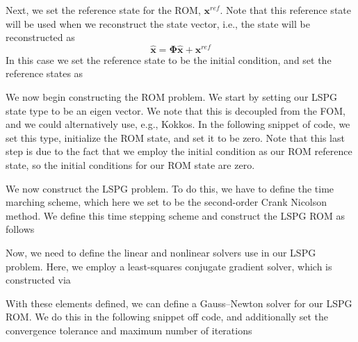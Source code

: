 Next, we set the reference state for the R\+OM, $\boldsymbol x^{ref}$. Note that this reference state will be used when we reconstruct the state vector, i.\+e., the state will be reconstructed as \[\hat{ \boldsymbol x} = \boldsymbol \Phi \hat{\boldsymbol x} + \boldsymbol x^{ref}\] In this case we set the reference state to be the initial condition, and set the reference states as 
\begin{DoxyCode}{0}
\end{DoxyCode}


We now begin constructing the R\+OM problem. We start by setting our L\+S\+PG state type to be an eigen vector. We note that this is decoupled from the F\+OM, and we could alternatively use, e.\+g., Kokkos. In the following snippet of code, we set this type, initialize the R\+OM state, and set it to be zero. Note that this last step is due to the fact that we employ the initial condition as our R\+OM reference state, so the initial conditions for our R\+OM state are zero. 
\begin{DoxyCode}{0}
\end{DoxyCode}


We now construct the L\+S\+PG problem. To do this, we have to define the time marching scheme, which here we set to be the second-\/order Crank Nicolson method. We define this time stepping scheme and construct the L\+S\+PG R\+OM as follows 
\begin{DoxyCode}{0}
\end{DoxyCode}


Now, we need to define the linear and nonlinear solvers use in our L\+S\+PG problem. Here, we employ a least-\/squares conjugate gradient solver, which is constructed via 
\begin{DoxyCode}{0}
\end{DoxyCode}


With these elements defined, we can define a Gauss--Newton solver for our L\+S\+PG R\+OM. We do this in the following snippet off code, and additionally set the convergence tolerance and maximum number of iterations 
\begin{DoxyCode}{0}
\end{DoxyCode}


